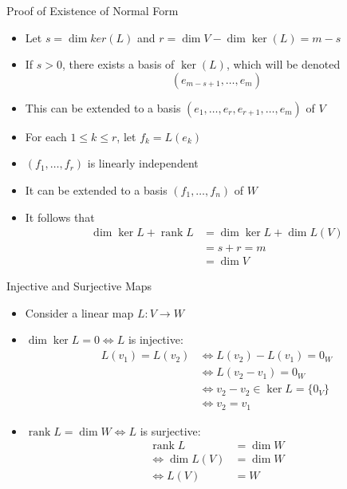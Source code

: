 \documentclass[usenames,dvipsnames,10pt]{beamer}
\newcommand\rank{\operatorname{rank}}
\begin{document}
\begin{frame}
  {Proof of Existence of Normal Form}

  \begin{itemize}
  \item Let $s = \dim ker(L)$ and $r = \dim V - \dim \ker(L) = m-s$
  \item If $s > 0$, there exists a basis of $\ker(L)$, which will be denoted
    \[ (e_{m-s+1}, \dots, e_m) \]
  \item This can be extended to a basis $(e_1, \dots, e_r, e_{r+1}, \dots, e_m)$ of $V$
  \item For each $1 \le k \le r$, let $f_k = L(e_k)$
  \item $(f_1, \dots, f_r)$ is linearly independent
  \item It can be extended to a basis $(f_1, \dots, f_n)$ of $W$
  \item It follows that
    \begin{align*}
      \dim \ker L + \rank L &= \dim \ker L + \dim L(V)\\
                            &= s + r = m \\
                            &= \dim V
    \end{align*}
  \end{itemize}
\end{frame}

\begin{frame}
  {Injective and Surjective Maps}

  \begin{itemize}
  \item Consider a linear map $L: V \rightarrow W$
  \item $\dim \ker L = 0 \iff L$ is injective:
    \begin{align*}
      L(v_1) = L(v_2)
      & \iff L(v_2)-L(v_1) = 0_W\\
      &\iff L(v_2-v_1) = 0_W\\
      & \iff v_2-v_2 \in \ker L = \{0_V\}\\
      &\iff v_2 = v_1
    \end{align*}
  \item $\rank L = \dim W \iff L$ is surjective:
    \begin{align*}
      \rank L &= \dim W\\
      \iff \dim L(V) &= \dim W\\
      \iff L(V) &= W
    \end{align*}
  \end{itemize}
\end{frame}
\end{document}
